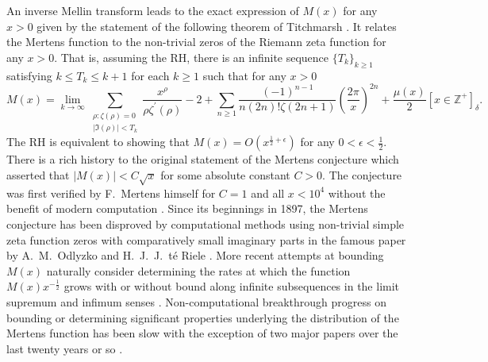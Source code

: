 \documentclass[10pt,reqno,letterpaper]{article}
\theoremstyle{plain}
\numberwithin{theorem}{section}
\theoremstyle{definition}
\newcommand{\Iverson}[1]{\ensuremath{\left[#1\right]_{\delta}}}
\begin{document}
An inverse Mellin transform leads to the exact expression of $M(x)$ for any $x > 0$ 
given by the statement of the following theorem of Titchmarsh \cite{TITCHMARSH}. 
It relates the Mertens function 
to the non-trivial zeros of the Riemann zeta function for any $x > 0$. 
That is, assuming the RH, there is an infinite sequence 
$\{T_k\}_{k \geq 1}$ satisfying $k \leq T_k \leq k+1$ for each $k \geq 1$ 
such that for any $x > 0$ 
\[
M(x) = \lim_{k \rightarrow \infty} 
     \sum_{\substack{\rho: \zeta(\rho) = 0 \\ |\Im(\rho)| < T_k}} 
     \frac{x^{\rho}}{\rho \zeta^{\prime}(\rho)} - 2 + 
     \sum_{n \geq 1} \frac{(-1)^{n-1}}{n (2n)! \zeta(2n+1)} 
     \left(\frac{2\pi}{x}\right)^{2n} + 
     \frac{\mu(x)}{2} \Iverson{x \in \mathbb{Z}^{+}}. 
\]
The RH is equivalent to showing that 
$M(x) = O\left(x^{\frac{1}{2}+\epsilon}\right)$ for any 
$0 < \epsilon < \frac{1}{2}$. 
There is a rich history to the original statement of the Mertens conjecture which 
asserted that $|M(x)| < C \sqrt{x}$ for some absolute constant $C > 0$.
The conjecture was first verified by F.~Mertens himself for $C = 1$ and all $x < 10^{4}$ 
without the benefit of modern computation \cite{HAVIL-GAMMA}. 
Since its beginnings in 1897, the Mertens conjecture has been disproved by computational methods using 
non-trivial simple zeta function zeros with comparatively small imaginary parts in the famous paper by 
A.~M.~Odlyzko and H.~J.~J.~t\'{e} Riele \cite{ODLYZ-TRIELE}. 
More recent attempts 
at bounding $M(x)$ naturally consider determining the rates at which the function 
$M(x) x^{-\frac{1}{2}}$ grows with or without bound along infinite 
subsequences in the limit supremum and infimum senses 
\cite{ORDER-MERTENSFN}. 
Non-computational breakthrough progress on 
bounding or determining significant properties 
underlying the distribution of the Mertens function has been slow with the 
exception of two major papers over the last twenty years or so 
\cite{NG-MERTENS,SOUND-MERTENS-ANNALS}. 
\end{document}
